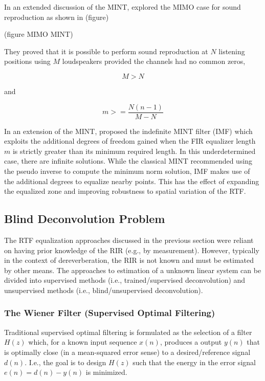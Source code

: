 In an extended discussion of the MINT,  \cite{miyoshi1988inverse} explored the MIMO case for sound reproduction as shown in (figure)

(figure MIMO MINT)

They proved that it is possible to perform sound reproduction at $N$ listening positions using $M$ loudspeakers provided the channels had no common zeros,

\begin{equation}
	M > N
\end{equation}

and

\begin{equation}
	m >= \frac{N(n-1)}{M-N}
\end{equation}

In an extension of the MINT, \cite{nakajima1997sound} proposed the indefinite MINT filter (IMF) which exploits the additional degrees of freedom gained when the FIR equalizer length $m$ is strictly greater than its minimum required length. In this underdetermined case, there are infinite solutions. While the classical MINT recommended using the pseudo inverse to compute the minimum norm solution, IMF makes use of the additional degrees to equalize nearby points. This has the effect of expanding the equalized zone and improving robustness to spatial variation of the RTF.


\subsection{Blind Deconvolution Problem}

The RTF equalization approaches discussed in the previous section were reliant on having prior knowledge of the RIR (e.g., by measurement). However, typically in the context of dereverberation, the RIR is not known and must be estimated by other means. The approaches to estimation of a unknown linear system can be divided into supervised methods (i.e., trained/supervised deconvolution) and unsupervised methods (i.e., blind/unsupervised deconvolution).

\subsubsection{The Wiener Filter (Supervised Optimal Filtering)}

Traditional supervised optimal filtering is formulated as the selection of a filter $H(z)$ which, for a known input sequence $x(n)$, produces a output $y(n)$ that is optimally close (in a mean-squared error sense) to a desired/reference signal $d(n)$. I.e., the goal is to design $H(z)$ such that the energy in the error signal $e(n) = d(n)-y(n)$ is minimized. 

